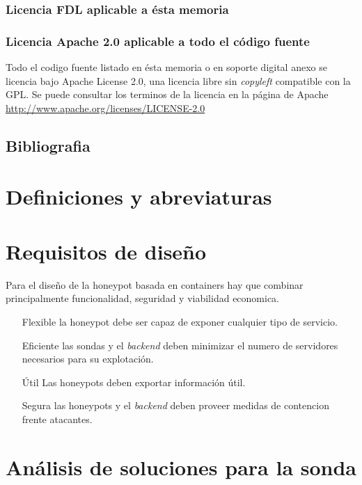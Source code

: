 \subsubsection{Licencia FDL aplicable a ésta memoria}

\subsubsection{Licencia Apache 2.0 aplicable a todo el código fuente}
Todo el codigo fuente listado en ésta memoria o en soporte digital anexo se licencia bajo Apache License 2.0, una licencia libre sin \emph{copyleft} compatible con la GPL.
Se puede consultar los terminos de la licencia en la página de Apache \url{http://www.apache.org/licenses/LICENSE-2.0}

\subsection{Bibliografia}
\printbibliography[title={Referencias},heading=none]
\nopagebreak
\section{Definiciones y abreviaturas}
\section{Requisitos de diseño}

Para el diseño de la honeypot basada en containers hay que combinar principalmente funcionalidad, seguridad y viabilidad economica.

\begin{enumerate}
    \item[Flexible] la honeypot debe ser capaz de exponer cualquier tipo de servicio.
    \item[Eficiente] las sondas y el \emph{backend} deben minimizar el numero de servidores necesarios para su explotación.
    \item[Útil] Las honeypots deben exportar información útil.
    \item[Segura] las honeypots y el \emph{backend} deben proveer medidas de contencion frente atacantes.  
\end{enumerate}


\section{Análisis de soluciones para la sonda}
\label{sec:analisis-sonda}


